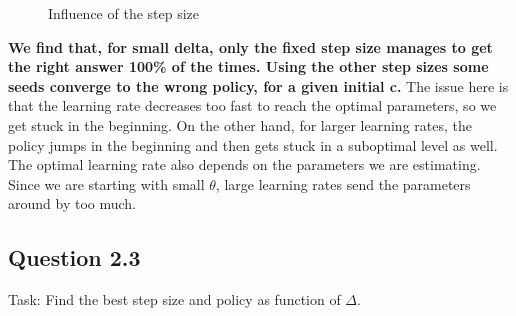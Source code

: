 \documentclass[a4paper, 11pt]{article} %
\begin{document}
   \begin{figure}[!htb]
        \caption{\label{fig:my-label} Influence of the step size}
      \end{figure}

\textbf{We find that, for small delta, only the fixed step size manages to get the right answer 100\% of the times. Using the other step sizes some seeds converge to the wrong policy, for a given initial c.} The issue here is that the learning rate decreases too fast to reach the optimal parameters, so we get stuck in the beginning. On the other hand, for larger learning rates, the policy jumps in the beginning and then gets stuck in a suboptimal level as well. \\

The optimal learning rate also depends on the parameters we are estimating. Since we are starting with small $\theta$, large learning rates send the parameters around by too much.

\subsection*{Question 2.3}

Task: Find the best step size and policy as function of $\Delta$. \\
\end{document}
